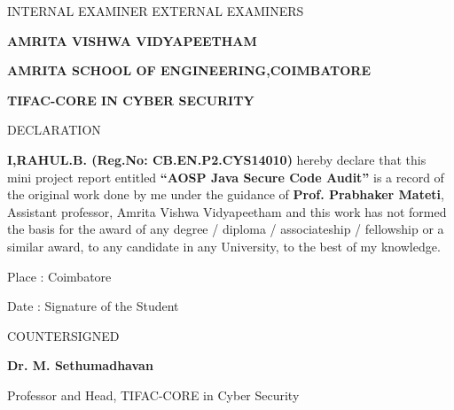 \vspace*{52pt}
\begin{flushleft}
\noindent
INTERNAL EXAMINER \hspace*{150pt} EXTERNAL EXAMINERS
\end{flushleft}

\clearpage




\begin{center}
\large
\textbf{AMRITA VISHWA VIDYAPEETHAM}

\normalsize
\textbf{AMRITA SCHOOL OF ENGINEERING,COIMBATORE}

\textbf{TIFAC-CORE IN CYBER SECURITY}

\vspace*{42pt}
\normalsize
DECLARATION

\end{center}

\vspace*{32pt}


\begin{sloppypar}
\noindent
\textbf{I,RAHUL.B. (Reg.No: CB.EN.P2.CYS14010)} hereby declare that this mini project report entitled \textbf{``AOSP Java Secure Code Audit''} is a record of the original work done by me under the guidance of \textbf{Prof. Prabhaker Mateti}, Assistant professor, Amrita Vishwa Vidyapeetham and this work has not formed the basis for the award of any degree / diploma / associateship / fellowship or a similar award, to any candidate in any University, to the best of my knowledge.
\end{sloppypar}

\vspace*{42pt}
\begin{flushleft}
\noindent
Place : Coimbatore

\vspace*{10pt}
\noindent
Date :
\hspace*{250pt}
Signature of the Student
\end{flushleft}

\begin{center}

\vspace*{70pt}
COUNTERSIGNED

\vspace*{50pt}
\textbf{Dr. M. Sethumadhavan}

Professor and Head, TIFAC-CORE in Cyber Security

\end{center}
 

\clearpage %


